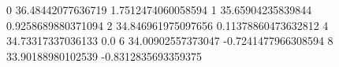 0 36.48442077636719 1.7512474060058594
1 35.65904235839844 0.9258689880371094
2 34.846961975097656 0.11378860473632812
4 34.73317337036133 0.0
6 34.00902557373047 -0.7241477966308594
8 33.90188980102539 -0.8312835693359375

